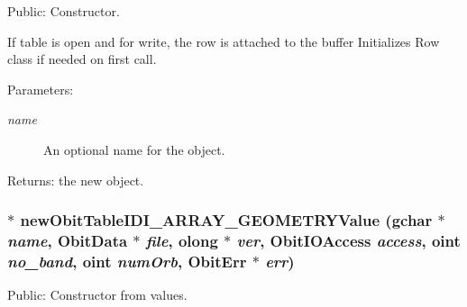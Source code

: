 Public: Constructor. 

If table is open and for write, the row is attached to the buffer Initializes Row class if needed on first call. \begin{Desc}
\item[Parameters:]
\begin{description}
\item[{\em name}]An optional name for the object. \end{description}
\end{Desc}
\begin{Desc}
\item[Returns:]the new object. \end{Desc}
\subsubsection{$\ast$ new\-Obit\-Table\-IDI\_\-ARRAY\_\-GEOMETRYValue (gchar $\ast$ {\em name}, {\bf Obit\-Data} $\ast$ {\em file}, {\bf olong} $\ast$ {\em ver}, Obit\-IOAccess {\em access}, {\bf oint} {\em no\_\-band}, {\bf oint} {\em num\-Orb}, {\bf Obit\-Err} $\ast$ {\em err})}\label{ObitTableIDI__ARRAY__GEOMETRY_8h_a12}


Public: Constructor from values. 

